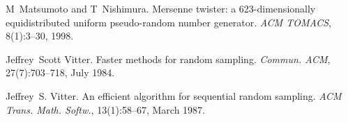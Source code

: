 
\begin{DoxyDescription}
\item[\label{_CITEREF_matsumoto98a}%
\mbox{[}1\mbox{]}]M~Matsumoto and T~Nishimura. Mersenne twister\+: a 623-\/dimensionally equidistributed uniform pseudo-\/random number generator. {\itshape A\+CM T\+O\+M\+A\+CS}, 8(1)\+:3--30, 1998.


\item[\label{_CITEREF_vitter84a}%
\mbox{[}2\mbox{]}]Jeffrey~Scott Vitter. Faster methods for random sampling. {\itshape Commun. A\+CM}, 27(7)\+:703--718, July 1984.


\item[\label{_CITEREF_vitter87a}%
\mbox{[}3\mbox{]}]Jeffrey~S. Vitter. An efficient algorithm for sequential random sampling. {\itshape A\+CM Trans. Math. Softw.}, 13(1)\+:58--67, March 1987.


\end{DoxyDescription}